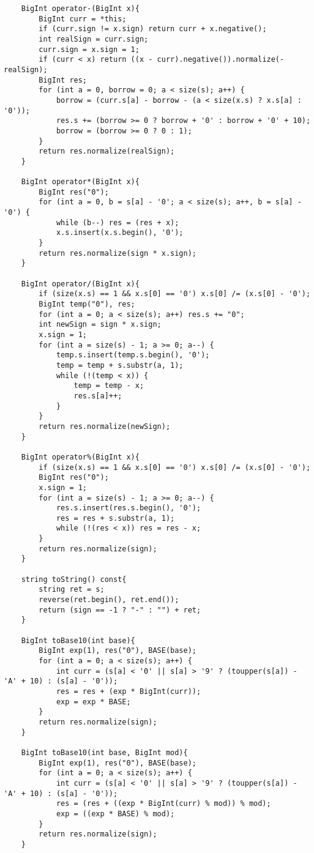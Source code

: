 \documentclass[12pt,a4paper,onesided]{article}
\begin{document}
\begin{multicols}{3}
\begin{lstlisting}
    BigInt operator-(BigInt x){
        BigInt curr = *this;
        if (curr.sign != x.sign) return curr + x.negative();
        int realSign = curr.sign;
        curr.sign = x.sign = 1;
        if (curr < x) return ((x - curr).negative()).normalize(-realSign);
        BigInt res;
        for (int a = 0, borrow = 0; a < size(s); a++) {
            borrow = (curr.s[a] - borrow - (a < size(x.s) ? x.s[a] : '0'));
            res.s += (borrow >= 0 ? borrow + '0' : borrow + '0' + 10);
            borrow = (borrow >= 0 ? 0 : 1);
        }
        return res.normalize(realSign);
    }

    BigInt operator*(BigInt x){
        BigInt res("0");
        for (int a = 0, b = s[a] - '0'; a < size(s); a++, b = s[a] - '0') {
            while (b--) res = (res + x);
            x.s.insert(x.s.begin(), '0');
        }
        return res.normalize(sign * x.sign);
    }

    BigInt operator/(BigInt x){
        if (size(x.s) == 1 && x.s[0] == '0') x.s[0] /= (x.s[0] - '0');
        BigInt temp("0"), res;
        for (int a = 0; a < size(s); a++) res.s += "0";
        int newSign = sign * x.sign;
        x.sign = 1;
        for (int a = size(s) - 1; a >= 0; a--) {
            temp.s.insert(temp.s.begin(), '0');
            temp = temp + s.substr(a, 1);
            while (!(temp < x)) {
                temp = temp - x;
                res.s[a]++;
            }
        }
        return res.normalize(newSign);
    }

    BigInt operator%(BigInt x){
        if (size(x.s) == 1 && x.s[0] == '0') x.s[0] /= (x.s[0] - '0');
        BigInt res("0");
        x.sign = 1;
        for (int a = size(s) - 1; a >= 0; a--) {
            res.s.insert(res.s.begin(), '0');
            res = res + s.substr(a, 1);
            while (!(res < x)) res = res - x;
        }
        return res.normalize(sign);
    }

    string toString() const{
        string ret = s;
        reverse(ret.begin(), ret.end());
        return (sign == -1 ? "-" : "") + ret;
    }

    BigInt toBase10(int base){
        BigInt exp(1), res("0"), BASE(base);
        for (int a = 0; a < size(s); a++) {
            int curr = (s[a] < '0' || s[a] > '9' ? (toupper(s[a]) - 'A' + 10) : (s[a] - '0'));
            res = res + (exp * BigInt(curr));
            exp = exp * BASE;
        }
        return res.normalize(sign);
    }

    BigInt toBase10(int base, BigInt mod){
        BigInt exp(1), res("0"), BASE(base);
        for (int a = 0; a < size(s); a++) {
            int curr = (s[a] < '0' || s[a] > '9' ? (toupper(s[a]) - 'A' + 10) : (s[a] - '0'));
            res = (res + ((exp * BigInt(curr) % mod)) % mod);
            exp = ((exp * BASE) % mod);
        }
        return res.normalize(sign);
    }


\end{lstlisting}
\end{multicols}
\end{document}
